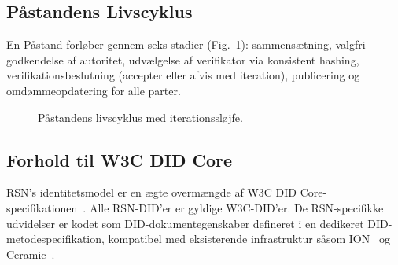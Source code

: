 \documentclass[11pt,a4paper,twocolumn]{article}
\begin{document}
\subsection{Påstandens Livscyklus}

En Påstand forløber gennem seks stadier (Fig.~\ref{fig:lifecycle}): sammensætning, valgfri godkendelse af autoritet, udvælgelse af verifikator via konsistent hashing, verifikationsbeslutning (accepter eller afvis med iteration), publicering og omdømmeopdatering for alle parter.

\begin{figure}[ht]
\centering
{}
\caption{Påstandens livscyklus med iterationssløjfe.}
\label{fig:lifecycle}
\end{figure}

\subsection{Forhold til W3C DID Core}

RSN's identitetsmodel er en ægte overmængde af W3C DID Core-specifikationen~\cite{did2022}. Alle RSN-DID'er er gyldige W3C-DID'er. De RSN-specifikke udvidelser er kodet som DID-dokumentegenskaber defineret i en dedikeret DID-metodespecifikation, kompatibel med eksisterende infrastruktur såsom ION~\cite{buchner2021} og Ceramic~\cite{ceramic2023}.

\end{document}
